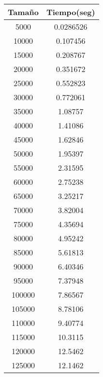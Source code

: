 \begin{longtable}{|c|c|}
\hline
\textbf{Tamaño} & \textbf{Tiempo(seg)} \\ \hline
5000   & 0.0286526   \\ \hline
10000  & 0.107456    \\ \hline
15000  & 0.208767    \\ \hline
20000  & 0.351672    \\ \hline
25000  & 0.552823    \\ \hline
30000  & 0.772061    \\ \hline
35000  & 1.08757     \\ \hline
40000  & 1.41086     \\ \hline
45000  & 1.62846     \\ \hline
50000  & 1.95397     \\ \hline
55000  & 2.31595     \\ \hline
60000  & 2.75238     \\ \hline
65000  & 3.25217     \\ \hline
70000  & 3.82004     \\ \hline
75000  & 4.35694     \\ \hline
80000  & 4.95242     \\ \hline
85000  & 5.61813     \\ \hline
90000  & 6.40346     \\ \hline
95000  & 7.37948     \\ \hline
100000 & 7.86567     \\ \hline
105000 & 8.78106     \\ \hline
110000 & 9.40774     \\ \hline
115000 & 10.3115     \\ \hline
120000 & 12.5462     \\ \hline
125000 & 12.1462     \\ \hline
\end{longtable}
